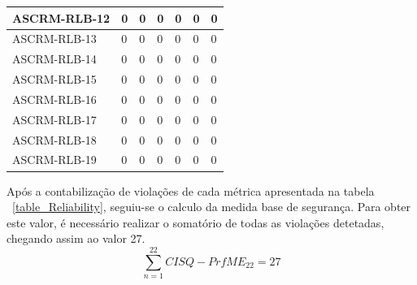 \documentclass[openany,10pt,a4paper]{article}
\begin{document}
\begin{longtable}{p{1.9in}|p{0.28in}|p{0.28in}|p{0.28in}|p{0.28in}|p{0.28in}|p{0.35in}}
ASCRM-RLB-12 & 0 & 0 & 0 & 0 & 0 & 0 \\ \hline
ASCRM-RLB-13 & 0 & 0 & 0 & 0 & 0 & 0 \\ \hline
ASCRM-RLB-14 & 0 & 0 & 0 & 0 & 0 & 0 \\ \hline
ASCRM-RLB-15 & 0 & 0 & 0 & 0 & 0 & 0 \\ \hline
ASCRM-RLB-16 & 0 & 0 & 0 & 0 & 0 & 0 \\ \hline
ASCRM-RLB-17 & 0 & 0 & 0 & 0 & 0 & 0 \\ \hline
ASCRM-RLB-18 & 0 & 0 & 0 & 0 & 0 & 0 \\ \hline
ASCRM-RLB-19 & 0 & 0 & 0 & 0 & 0 & 0 \\ \hline
\end{longtable} 
Após a contabilização de violações de cada métrica apresentada na tabela ~\ref{table_Reliability}, seguiu-se o calculo da medida base de segurança. Para obter este valor, é necessário realizar o somatório de todas as violações detetadas, chegando assim ao valor 27.
$$\sum_{n=1}^{22} CISQ - PrfME_{22} = 27$$
\end{document}
